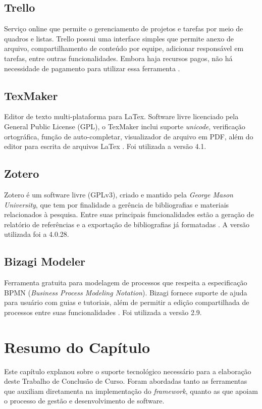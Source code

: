 \subsection{Trello} 
Serviço online que permite o gerenciamento de projetos e tarefas por meio de quadros e listas. Trello possui uma interface simples que permite anexo de arquivo, compartilhamento de conteúdo por equipe, adicionar responsável em tarefas,  entre outras funcionalidades. Embora haja recursos pagos, não há necessidade de pagamento para utilizar essa ferramenta \cite{trello2015}.

\subsection{TexMaker}
Editor de texto multi-plataforma para LaTex. Software livre licenciado pela General Public License (GPL), o TexMaker inclui suporte \textit{unicode}, verificação ortográfica, função de auto-completar, visualizador de arquivo em PDF, além do editor para escrita de arquivos LaTex \cite{texmaker2014}. Foi utilizada a versão 4.1.

\subsection{Zotero}
Zotero é um software livre (GPLv3), criado e mantido pela \textit{George Mason University}, que tem por finalidade a gerência de bibliografias e materiais relacionados à pesquisa. Entre suas principais funcionalidades estão a geração de relatório de referências e a exportação de bibliografias já formatadas \cite{zotero2015}. A versão utilizada foi a 4.0.28.

\subsection{Bizagi Modeler}
Ferramenta gratuita para modelagem de processos que respeita a especificação BPMN (\textit{Business Process Modeling Notation}). Bizagi fornece suporte de ajuda para usuário com guias e tutoriais, além de permitir a edição compartilhada de processos entre suas funcionalidades \cite{bizagi2015}. Foi utilizada a versão 2.9.

\section{Resumo do Capítulo}
Este capítulo explanou sobre o suporte tecnológico necessário para a elaboração deste Trabalho de Conclusão de Curso. Foram abordadas tanto as ferramentas que auxiliam diretamenta na implementação do \textit{framework}, quanto as que apoiam o processo de gestão e desenvolvimento de software.
